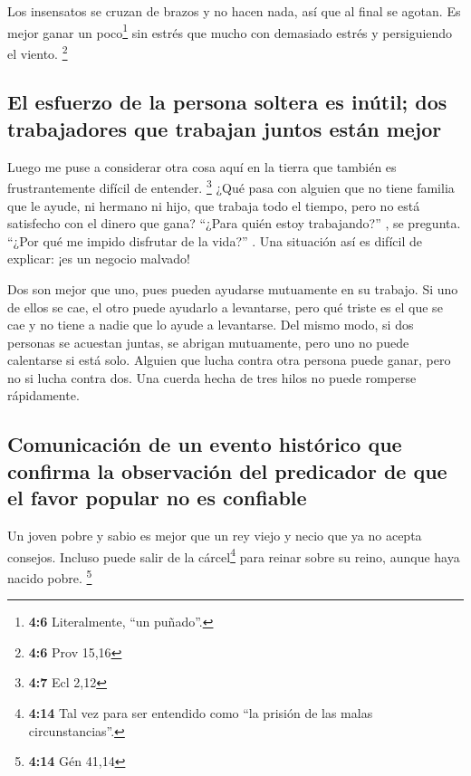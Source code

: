  Los insensatos se cruzan de brazos y no hacen nada, así
que al final se agotan.  Es mejor ganar un poco\footnote{\textbf{4:6}
  Literalmente, ``un puñado''.} sin estrés que mucho con demasiado
estrés y persiguiendo el viento. \footnote{\textbf{4:6} Prov 15,16}

\hypertarget{el-esfuerzo-de-la-persona-soltera-es-inuxfatil-dos-trabajadores-que-trabajan-juntos-estuxe1n-mejor}{%
\subsection{El esfuerzo de la persona soltera es inútil; dos
trabajadores que trabajan juntos están
mejor}\label{el-esfuerzo-de-la-persona-soltera-es-inuxfatil-dos-trabajadores-que-trabajan-juntos-estuxe1n-mejor}}

 Luego me puse a considerar otra cosa aquí en la tierra
que también es frustrantemente difícil de entender. \footnote{\textbf{4:7}
  Ecl 2,12}  ¿Qué pasa con alguien que no tiene familia
que le ayude, ni hermano ni hijo, que trabaja todo el tiempo, pero no
está satisfecho con el dinero que gana? ``¿Para quién estoy
trabajando?'' , se pregunta. ``¿Por qué me impido disfrutar de la
vida?'' . Una situación así es difícil de explicar: ¡es un negocio
malvado!

 Dos son mejor que uno, pues pueden ayudarse mutuamente en
su trabajo.  Si uno de ellos se cae, el otro puede
ayudarlo a levantarse, pero qué triste es el que se cae y no tiene a
nadie que lo ayude a levantarse.  Del mismo modo, si dos
personas se acuestan juntas, se abrigan mutuamente, pero uno no puede
calentarse si está solo.  Alguien que lucha contra otra
persona puede ganar, pero no si lucha contra dos. Una cuerda hecha de
tres hilos no puede romperse rápidamente.

\hypertarget{comunicaciuxf3n-de-un-evento-histuxf3rico-que-confirma-la-observaciuxf3n-del-predicador-de-que-el-favor-popular-no-es-confiable}{%
\subsection{Comunicación de un evento histórico que confirma la
observación del predicador de que el favor popular no es
confiable}\label{comunicaciuxf3n-de-un-evento-histuxf3rico-que-confirma-la-observaciuxf3n-del-predicador-de-que-el-favor-popular-no-es-confiable}}

 Un joven pobre y sabio es mejor que un rey viejo y necio
que ya no acepta consejos.  Incluso puede salir de la
cárcel\footnote{\textbf{4:14} Tal vez para ser entendido como ``la
  prisión de las malas circunstancias''.} para reinar sobre su reino,
aunque haya nacido pobre. \footnote{\textbf{4:14} Gén 41,14}

